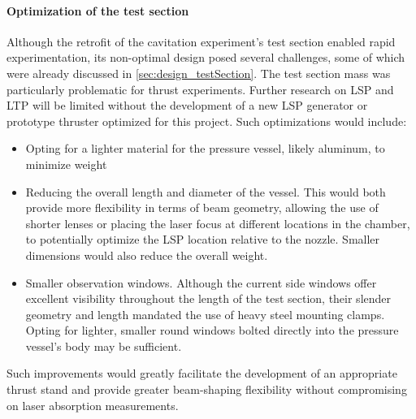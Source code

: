         \paragraph{Optimization of the test section} Although the retrofit of the cavitation experiment's test section enabled rapid experimentation, its non-optimal design posed several challenges, some of which were already discussed in \autoref{sec:design_testSection}. The test section mass was particularly problematic for thrust experiments. Further research on LSP and LTP will be limited without the development of a new LSP generator or prototype thruster optimized for this project. Such optimizations would include:
        \begin{itemize}
            \item Opting for a lighter material for the pressure vessel, likely aluminum, to minimize weight
            \item Reducing the overall length and diameter of the vessel. This would both provide more flexibility in terms of beam geometry, allowing the use of shorter lenses or placing the laser focus at different locations in the chamber, to potentially optimize the LSP location relative to the nozzle. Smaller dimensions would also reduce the overall weight.
            \item Smaller observation windows. Although the current side windows offer excellent visibility throughout the length of the test section, their slender geometry and length mandated the use of heavy steel mounting clamps. Opting for lighter, smaller round windows bolted directly into the pressure vessel's body may be sufficient.
        \end{itemize}
        Such improvements would greatly facilitate the development of an appropriate thrust stand and provide greater beam-shaping flexibility without compromising on laser absorption measurements.

